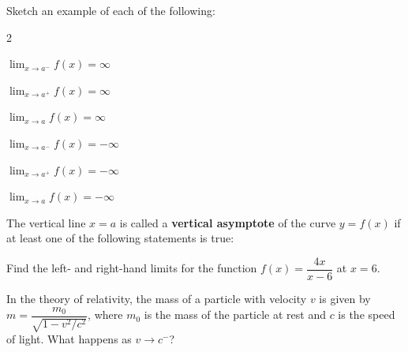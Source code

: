 \documentclass[notes]{subfiles}
\begin{document}
		\begin{ex}
			Sketch an example of each of the following:
			\begin{center}
				\begin{enumerate}[(a)]
				\setlength\itemsep{1.2in}
				\end{enumerate}
			\end{center}
		\end{ex}

			\newpage
			
		\begin{defn}
			The vertical line $x = a$ is called a \textbf{vertical asymptote} of the curve $y = f(x)$ if at least one of the following statements is true:
			\showto{ins}{
				\[\lim_{x\to a} f(x) = \infty \qquad \lim_{x\to a^-} f(x) = \infty \qquad \lim_{x\to a^+}f(x) = \infty\]
				\[\lim_{x\to a} f(x) = -\infty \qquad \lim_{x\to a^-} f(x) = -\infty \qquad \lim_{x\to a^+} f(x) = -\infty\]
			}
			\showto{st}{
				\\ $ $\vspace*{1.5in}
			}
		\end{defn}
		
		\begin{ex}
			Find the left- and right-hand limits for the function $f(x) = \dfrac{4x}{x-6}$ at $x = 6$.  
				\vs{1}
		\end{ex}
			
		\begin{ex}
			In the theory of relativity, the mass of a particle with velocity $v$ is given by $m = \dfrac{m_0}{\sqrt{1-v^2/c^2}}$, where $m_0$ is the mass of the particle at rest and $c$ is the speed of light.  What happens as $v\to c^-$?
				\vs{1}
		\end{ex}
			\newpage
			
\end{document}
